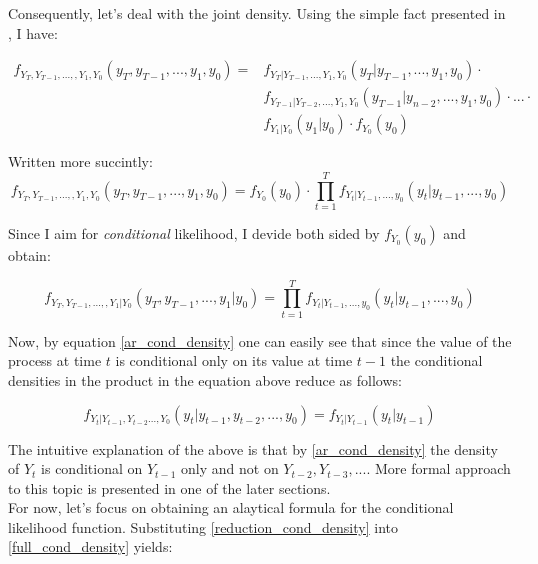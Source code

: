 \documentclass[12pt]{article}
\begin{document}
Consequently, let's deal with the joint density. Using the simple fact presented in
 \cite{my_note_cond_prob_tsa}, I have: 

\begin{equation*}
\begin{split}
f_{Y_T, Y_{T-1}, ..., ,Y_1, Y_0}(y_T, y_{T-1}, ..., y_1, y_0) = 
& f_{Y_T | Y_{T-1}, ..., Y_1, Y_0}(y_T | y_{T-1}, ..., y_1, y_0) \cdot \\
& f_{Y_{T-1} | Y_{T-2}, ..., Y_1, Y_0}(y_{T-1} | y_{n-2}, ..., y_1, y_0) \cdot ... \cdot \\
& f_{Y_1 | Y_0} (y_1 | y_0) \cdot f_{Y_0}(y_0)
\end{split}
\end{equation*}

Written more succintly:
\begin{equation*}
f_{Y_T, Y_{T-1}, ..., ,Y_1, Y_0}(y_T, y_{T-1}, ..., y_1, y_0) = 
f_{Y_0}(y_0) \cdot
 \prod_{t=1}^{T} f_{Y_t | Y_{t-1}, ..., y_0} (y_t | y_{t-1}, ..., y_0)
\end{equation*}

Since I aim for \textit{conditional} likelihood, I devide both sided by $f_{Y_0}(y_0)$ 
and obtain:

\begin{equation*}
\label{full_cond_density}
f_{Y_T, Y_{T-1}, ..., ,Y_1 | Y_0}(y_T, y_{T-1}, ..., y_1 | y_0) = 
 \prod_{t=1}^{T} f_{Y_t | Y_{t-1}, ..., y_0} (y_t | y_{t-1}, ..., y_0)
\end{equation*}

Now, by equation \eqref{ar_cond_density} one can easily see that since the value of the
 process at time $t$ is conditional only on its value at time $t-1$ the conditional 
 densities in the product in the equation above reduce as follows:

\begin{equation} 
\label{reduction_cond_density}
f_{Y_t | Y_{t-1}, Y_{t-2} ..., Y_0}(y_t | y_{t-1}, y_{t-2}, ..., y_0) = 
f_{Y_t | Y_{t-1}} (y_t | y_{t-1})
\end{equation}

The intuitive explanation of the above is that by \eqref{ar_cond_density} the density of 
$Y_t$ is conditional on $Y_{t-1}$ only and not on $Y_{t-2}, Y_{t-3}, ...$. More formal
 approach to this topic is presented in one of the later sections. \\
For now, let's focus on obtaining an alaytical formula for the conditional likelihood 
function. Substituting \eqref{reduction_cond_density} into \eqref{full_cond_density} 
yields:
\end{document}
